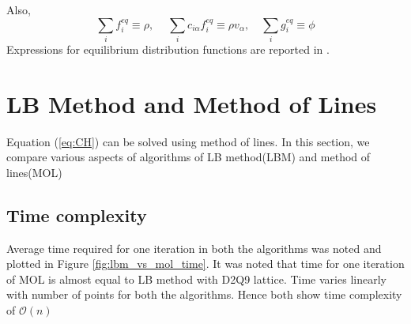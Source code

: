 \documentclass[11pt]{article}
\begin{document}
Also, 
\begin{equation}
 \sum_{i} f_{i}^{eq} \equiv \rho, \quad \  \sum_{i} c_{i\alpha} f_{i}^{eq} \equiv \rho v_{\alpha}, \quad \sum_{i} g_{i}^{eq} \equiv  \phi 
\label{eq:fg}
\end{equation}
Expressions for equilibrium distribution functions are reported in \cite{paper:intertial_effects}.

\section{LB Method and Method of Lines}
Equation (\ref{eq:CH}) can be solved using method of lines. In this section, we compare various aspects of algorithms of LB method(LBM) and method of lines(MOL)
\subsection*{Time complexity}
Average time required for one iteration in both the algorithms was noted and plotted in Figure \ref*{fig:lbm_vs_mol_time}. It was noted that time for one iteration of MOL is almost equal to LB method with D2Q9 lattice. Time varies linearly with number of points for both the algorithms. Hence both show time complexity of $\mathcal{O}(n)$
\end{document}
